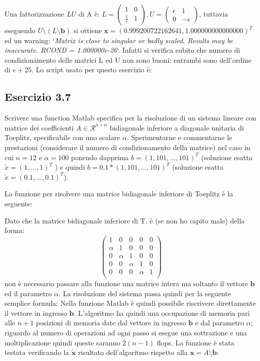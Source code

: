 Una fattorizzazione $LU$ di A è: $L = \begin{pmatrix} 1 & 0 \\ \frac{1}{\epsilon} & 1  \end{pmatrix}, U = \begin{pmatrix} \epsilon & 1 \\ 0 & -\epsilon  \end{pmatrix}$, tuttavia eseguendo $U\setminus(L\setminus \mathbf{b})$ si ottiene $\mathbf{x} = (0.999200722162641, 1.000000000000000)^T$ ed un warning: `\textit{Matrix is close to singular or badly scaled. Results may be inaccurate. RCOND =
1.000000e-26}`. Infatti si verifica subito che numero di condizionamento delle matrici L ed U non sono buoni: entrambi sono dell'ordine di $e+25$.
Lo script usato per questo esercizio è:



	\subsection{Esercizio 3.7}
Scrivere una function Matlab specifica per la risoluzione di un sistema lineare con matrice dei coefficienti $A \in \mathcal{R}^{n \times n}$ bidiagonale inferiore a diagonale unitaria di Toeplitz, specificabile con uno scalare $\alpha$. Sperimentarne e commentarne le prestazioni (considerare il numero di condizionamento della matrice) nel caso in cui $n = 12$ e $\alpha =100$ ponendo dapprima $b = (1, 101, \dots , 101)^T$ (soluzione esatta $\tilde{x} = (1, \dots , 1)^T$ ) e quindi $b = 0.1 * (1, 101, \dots , 101)^T$ (soluzione esatta $\tilde{x} = (0.1, \dots , 0.1)^T$).

La funzione per risolvere una matrice bidiagonale inferiore di Toeplitz è la seguente:

Dato che la matrice bidiagonale inferiore di T. è (se non ho capito male) della forma:
\[
\begin{pmatrix}
	1&0&0&0&0\\
	\alpha&1&0&0&0\\
	0&\alpha&1&0&0\\
	0&0&\alpha&1&0\\
	0&0&0&\alpha&1\\
\end{pmatrix}
\]
non è necessario passare alla funzione una matrice intera ma soltanto il vettore $\mathbf{b}$ ed il parametro $\alpha$.
La risoluzione del sistema passa quindi per la seguente semplice formula: 
Nella funzione Matlab è quindi possibile riscrivere direttamente il vettore in ingresso $\mathbf{b}$.
L'algoritmo ha quindi una occupazione di memoria pari alle $n+1$ posizioni di memoria date dal vettore in ingresso $\mathbf{b}$ e dal parametro $\alpha$; riguardo al numero di operazioni ad ogni passo si esegue una sottrazione e una moltiplicazione quindi queste saranno $2(n-1)$ flops.
La funzione è stata testata verificando la $\mathbf{\tilde{x}}$ risultato dell'algoritmo rispetto alla $\mathbf{x} = A\setminus\mathbf{b}$:




